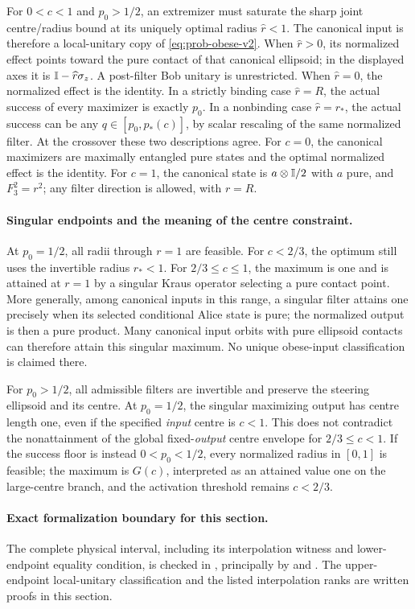 For $0<c<1$ and $p_0>1/2$, an extremizer must saturate the sharp joint
centre/radius bound at its uniquely optimal radius $\widehat r<1$.
The canonical input is therefore a local-unitary copy of
\eqref{eq:prob-obese-v2}. When $\widehat r>0$, its normalized effect points
toward the pure contact of that canonical ellipsoid; in the displayed axes
it is $\mathbb I-\widehat r\sigma_z$. A post-filter Bob unitary is unrestricted.
When $\widehat r=0$, the normalized effect is the identity. In a strictly
binding case $\widehat r=R$, the actual success of every maximizer is exactly
$p_0$. In a nonbinding case $\widehat r=r_*$, the actual success can be any
$q\in[p_0,p_*(c)]$, by scalar rescaling of the same normalized filter.
At the crossover these two descriptions agree. For $c=0$, the canonical
maximizers are maximally entangled pure states and the optimal normalized
effect is the identity. For $c=1$, the canonical state is
$a\otimes\mathbb I/2$ with $a$ pure, and $F_3^2=r^2$; any filter direction is
allowed, with $r=R$.

\paragraph{Singular endpoints and the meaning of the centre constraint.}
At $p_0=1/2$, all radii through $r=1$ are feasible. For $c<2/3$, the optimum
still uses the invertible radius $r_*<1$. For $2/3\leq c\leq1$, the maximum
is one and is attained at $r=1$ by a singular Kraus operator selecting a pure
contact point. More generally, among canonical inputs in this range,
a singular filter attains one precisely when its selected conditional
Alice state is pure; the normalized output is then a pure product.
Many canonical input orbits with pure ellipsoid contacts can therefore
attain this singular maximum. No unique obese-input classification is
claimed there.

For $p_0>1/2$, all admissible filters are invertible and preserve the steering
ellipsoid and its centre. At $p_0=1/2$, the singular maximizing output has
centre length one, even if the specified \emph{input} centre is $c<1$.
This does not contradict the nonattainment of the global fixed-\emph{output}
centre envelope for $2/3\leq c<1$. If the success floor is instead
$0<p_0<1/2$, every normalized radius in $[0,1]$ is feasible; the maximum is
$G(c)$, interpreted as an attained value one on the large-centre branch,
and the activation threshold remains $c<2/3$.

\paragraph{Exact formalization boundary for this section.}
The complete physical interval, including its interpolation witness and
lower-endpoint equality condition, is checked in
, principally by
 and
.
The upper-endpoint local-unitary classification and the listed interpolation
ranks are written proofs in this section.

